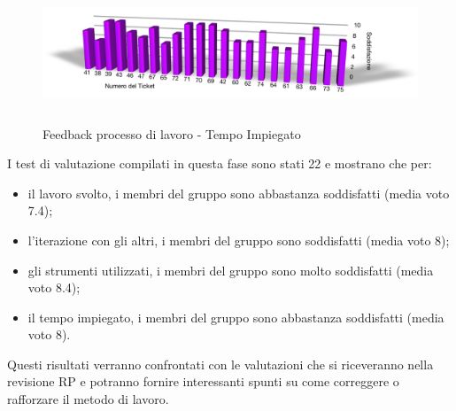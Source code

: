 \begin{figure}[htbp]
  \centering
  \includegraphics[height=4.1cm]{img/PQ/TempoImpiegato.png}
\caption{Feedback processo di lavoro - Tempo Impiegato}
\end{figure}

\newpage
I test di valutazione compilati in questa fase sono stati 22 e mostrano che
per:
\begin{itemize}
  \item il lavoro svolto, i membri del gruppo sono abbastanza
  soddisfatti (media voto 7.4);
  \item l'iterazione con gli altri, i membri del gruppo sono soddisfatti
  (media voto 8);
  \item gli strumenti utilizzati, i membri del gruppo
  sono molto soddisfatti (media voto 8.4);
  \item il tempo impiegato, i membri del gruppo
  sono abbastanza soddisfatti (media voto 8).\\
\end{itemize}

Questi risultati verranno confrontati con le valutazioni che si riceveranno
nella revisione RP e potranno fornire interessanti spunti su come correggere o
rafforzare il metodo di lavoro.



